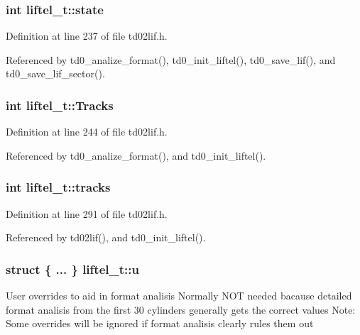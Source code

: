 \subsubsection[{\texorpdfstring{state}{state}}]{\setlength{\rightskip}{0pt plus 5cm}int liftel\+\_\+t\+::state}\hypertarget{structliftel__t_a579b9a2411fc6cf4bcdd4cac15d48e49}{}\label{structliftel__t_a579b9a2411fc6cf4bcdd4cac15d48e49}


Definition at line 237 of file td02lif.\+h.



Referenced by td0\+\_\+analize\+\_\+format(), td0\+\_\+init\+\_\+liftel(), td0\+\_\+save\+\_\+lif(), and td0\+\_\+save\+\_\+lif\+\_\+sector().

\subsubsection[{\texorpdfstring{Tracks}{Tracks}}]{\setlength{\rightskip}{0pt plus 5cm}int liftel\+\_\+t\+::\+Tracks}\hypertarget{structliftel__t_a1c433cb2546f09c4093f0e98d61212b2}{}\label{structliftel__t_a1c433cb2546f09c4093f0e98d61212b2}


Definition at line 244 of file td02lif.\+h.



Referenced by td0\+\_\+analize\+\_\+format(), and td0\+\_\+init\+\_\+liftel().

\subsubsection[{\texorpdfstring{tracks}{tracks}}]{\setlength{\rightskip}{0pt plus 5cm}int liftel\+\_\+t\+::tracks}\hypertarget{structliftel__t_a24244c0ee111d3f46eedd7578eb1acf7}{}\label{structliftel__t_a24244c0ee111d3f46eedd7578eb1acf7}


Definition at line 291 of file td02lif.\+h.



Referenced by td02lif(), and td0\+\_\+init\+\_\+liftel().

\subsubsection[{\texorpdfstring{u}{u}}]{\setlength{\rightskip}{0pt plus 5cm}struct \{ ... \}   liftel\+\_\+t\+::u}\hypertarget{structliftel__t_a039066f2594254d80396de7e4c1bf106}{}\label{structliftel__t_a039066f2594254d80396de7e4c1bf106}
User overrides to aid in format analisis Normally N\+OT needed bacause detailed format analisis from the first 30 cylinders generally gets the correct values Note\+: Some overrides will be ignored if format analisis clearly rules them out

